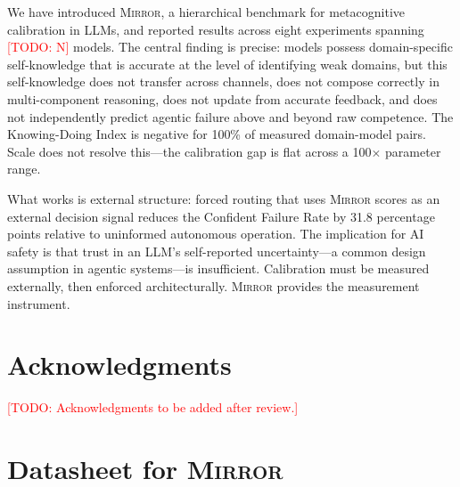 \documentclass[10pt]{article}
\newcommand{\todo}[1]{\textcolor{red}{[TODO: #1]}}
\newcommand{\mirror}{\textsc{Mirror}}
\begin{document}
We have introduced \mirror{}, a hierarchical benchmark for metacognitive calibration
in LLMs, and reported results across eight experiments spanning \todo{N} models.
The central finding is precise: models possess domain-specific self-knowledge that
is accurate at the level of identifying weak domains, but this self-knowledge
does not transfer across channels, does not compose correctly in multi-component
reasoning, does not update from accurate feedback, and does not independently predict
agentic failure above and beyond raw competence. The Knowing-Doing Index is negative
for 100\% of measured domain-model pairs. Scale does not resolve this---the calibration
gap is flat across a 100$\times$ parameter range.

What works is external structure: forced routing that uses \mirror{} scores as an
external decision signal reduces the Confident Failure Rate by 31.8 percentage points
relative to uninformed autonomous operation. The implication for AI safety is that
trust in an LLM's self-reported uncertainty---a common design assumption in
agentic systems---is insufficient. Calibration must be measured externally, then
enforced architecturally. \mirror{} provides the measurement instrument.

\section*{Acknowledgments}

\todo{Acknowledgments to be added after review.}



\newpage
\appendix

\section{Datasheet for \mirror{}}
\label{app:datasheet}



\end{document}
